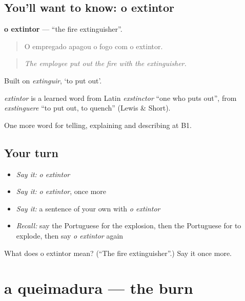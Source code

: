 \subsection*{You'll want to know: o extintor}
\textbf{o extintor} — \textquotedblleft{}the fire extinguisher\textquotedblright{}.

\begin{quote}
O empregado apagou o fogo com o extintor.
\end{quote}

\begin{quote}
\emph{The employee put out the fire with the extinguisher.}
\end{quote}

Built on \emph{extinguir}, ‘to put out’.

\begin{cousinweb}
\emph{extintor} is a learned word from Latin \emph{exstinctor} \textquotedblleft{}one who puts out\textquotedblright{}, from \emph{exstinguere} \textquotedblleft{}to put out, to quench\textquotedblright{} (Lewis \& Short).
\end{cousinweb}

\begin{grammarlens}[title={What you've built}]
One more word for telling, explaining and describing at B1.
\end{grammarlens}

\subsection*{Your turn}
\begin{itemize}
\raggedright
  \item \emph{Say it:} \emph{o extintor}
  \item \emph{Say it:} \emph{o extintor}, once more
  \item \emph{Say it:} a sentence of your own with \emph{o extintor}
  \item \emph{Recall:} say the Portuguese for the explosion, then the Portuguese for to explode, then say \emph{o extintor} again
\end{itemize}

\begin{tcolorbox}[breakable,colback=teal!4,colframe=teal!35!black,title={Before you move on}]
What does o extintor mean? (\textquotedblleft{}The fire extinguisher\textquotedblright{}.) Say it once more.
\end{tcolorbox}
\section[a queimadura]{a queimadura — the burn}

